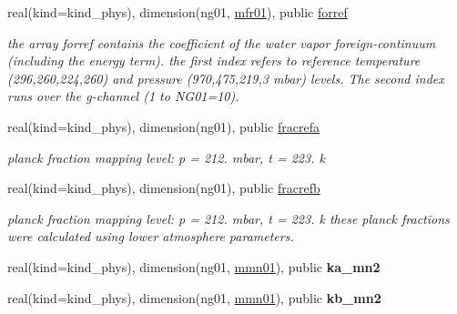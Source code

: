 \begin{DoxyCompactItemize}
real(kind=kind\+\_\+phys), dimension(ng01, \hyperlink{group__module__radlw__kgbnn_ga4bd2e710d96291436f9ee36e99816a19}{mfr01}), public \hyperlink{group__module__radlw__kgbnn_gacd70a32f88808dc40c39edee5b76adbe}{forref}
\begin{DoxyCompactList}\small\item\em the array forref contains the coefficient of the water vapor foreign-\/continuum (including the energy term). the first index refers to reference temperature (296,260,224,260) and pressure (970,475,219,3 mbar) levels. The second index runs over the g-\/channel (1 to N\+G01=10). \end{DoxyCompactList}\item 
real(kind=kind\+\_\+phys), dimension(ng01), public \hyperlink{group__module__radlw__kgbnn_ga0bca660247ac37483cd55c6936056631}{fracrefa}
\begin{DoxyCompactList}\small\item\em planck fraction mapping level\+: p = 212. mbar, t = 223. k \end{DoxyCompactList}\item 
real(kind=kind\+\_\+phys), dimension(ng01), public \hyperlink{group__module__radlw__kgbnn_ga19b6a3893965817e82c77bee1de536cd}{fracrefb}
\begin{DoxyCompactList}\small\item\em planck fraction mapping level\+: p = 212. mbar, t = 223. k these planck fractions were calculated using lower atmosphere parameters. \end{DoxyCompactList}\item 
real(kind=kind\+\_\+phys), dimension(ng01, \hyperlink{group__module__radlw__kgbnn_ga218c6844f9043f362571f091a4f80522}{mmn01}), public {\bfseries ka\+\_\+mn2}
\item 
real(kind=kind\+\_\+phys), dimension(ng01, \hyperlink{group__module__radlw__kgbnn_ga218c6844f9043f362571f091a4f80522}{mmn01}), public {\bfseries kb\+\_\+mn2}
\end{DoxyCompactItemize}
